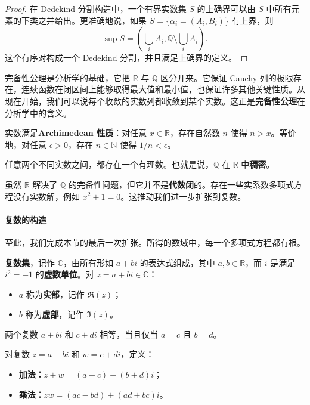 \begin{proof}
在 Dedekind 分割构造中，一个有界实数集 $S$ 的上确界可以由 $S$ 中所有元素的下类之并给出。更准确地说，如果 $S=\{\alpha_i=(A_i,B_i)\}$ 有上界，则
\[
\sup S=\left(\bigcup_i A_i,\mathbb{Q}\setminus \bigcup_i A_i\right).
\]
这个有序对构成一个 Dedekind 分割，并且满足上确界的定义。
\end{proof}

完备性公理是分析学的基础，它把 $\mathbb{R}$ 与 $\mathbb{Q}$ 区分开来。它保证 Cauchy 列的极限存在，连续函数在闭区间上能够取得最大值和最小值，也保证许多其他关键性质。从现在开始，我们可以说每个收敛的实数列都收敛到某个实数。这正是\textbf{完备性公理}在分析学中的含义。

\begin{definition}[Archimedean 性质]
实数满足\textbf{Archimedean 性质}：对任意 $x\in \mathbb{R}$，存在自然数 $n$ 使得 $n>x$。等价地，对任意 $\epsilon>0$，存在 $n\in \mathbb{N}$ 使得 $1/n<\epsilon$。
\end{definition}

\begin{theorem}[有理数的稠密性]
任意两个不同实数之间，都存在一个有理数。也就是说，$\mathbb{Q}$ 在 $\mathbb{R}$ 中\textbf{稠密}。
\end{theorem}

虽然 $\mathbb{R}$ 解决了 $\mathbb{Q}$ 的完备性问题，但它并不是\textbf{代数闭}的。存在一些实系数多项式方程没有实数解，例如 $x^2+1=0$。这推动我们进一步扩张到复数。

\paragraph{复数的构造}

至此，我们完成本节的最后一次扩张。所得的数域中，每一个多项式方程都有根。

\begin{definition}[复数]
\textbf{复数集}，记作 $\mathbb{C}$，由所有形如 $a+bi$ 的表达式组成，其中 $a,b\in \mathbb{R}$，而 $i$ 是满足 $i^2=-1$ 的\textbf{虚数单位}。对 $z=a+bi\in \mathbb{C}$：
\begin{itemize}
    \item $a$ 称为\textbf{实部}，记作 $\Re(z)$；
    \item $b$ 称为\textbf{虚部}，记作 $\Im(z)$。
\end{itemize}
\end{definition}

两个复数 $a+bi$ 和 $c+di$ 相等，当且仅当 $a=c$ 且 $b=d$。

\begin{definition}[复数运算]
对复数 $z=a+bi$ 和 $w=c+di$，定义：
\begin{itemize}
    \item \textbf{加法：}$z+w=(a+c)+(b+d)i$；
    \item \textbf{乘法：}$zw=(ac-bd)+(ad+bc)i$。
\end{itemize}
\end{definition}

